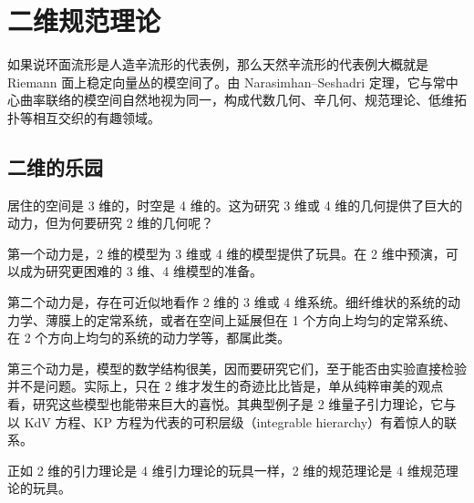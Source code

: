 
\chapter{二维规范理论}

如果说环面流形是人造辛流形的代表例，那么天然辛流形的代表例大概就是 Riemann 面上稳定向量丛的模空间了。由 Narasimhan--Seshadri 定理，它与常中心曲率联络的模空间自然地视为同一，构成代数几何、辛几何、规范理论、低维拓扑等相互交织的有趣领域。


\section{二维的乐园}

居住的空间是 3 维的，时空是 4 维的。这为研究 3 维或 4 维的几何提供了巨大的动力，但为何要研究 2 维的几何呢？

第一个动力是，2 维的模型为 3 维或 4 维的模型提供了玩具。在 2 维中预演，可以成为研究更困难的 3 维、4 维模型的准备。

第二个动力是，存在可近似地看作 2 维的 3 维或 4 维系统。细纤维状的系统的动力学、薄膜上的定常系统，或者在空间上延展但在 1 个方向上均匀的定常系统、在 2 个方向上均匀的系统的动力学等，都属此类。

第三个动力是，模型的数学结构很美，因而要研究它们，至于能否由实验直接检验并不是问题。实际上，只在 2 维才发生的奇迹比比皆是，单从纯粹审美的观点看，研究这些模型也能带来巨大的喜悦。其典型例子是 2 维量子引力理论，它与以 KdV 方程、KP 方程为代表的可积层级（integrable hierarchy）有着惊人的联系。


正如 2 维的引力理论是 4 维引力理论的玩具一样，2 维的规范理论是 4 维规范理论的玩具。

